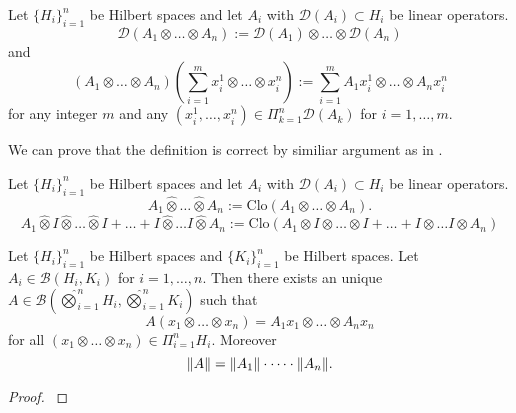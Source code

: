 \documentclass[main.tex]{subfiles}
\begin{document}
\begin{definition}
Let $\{H_i\}_{i=1}^n$ be Hilbert spaces and let $A_i$ with $\mathcal{D}(A_i)\subset H_i$ be linear operators.
\begin{equation}
\mathcal{D}(A_1 \otimes \dots \otimes A_n):=\mathcal{D}(A_1) \otimes \dots \otimes \mathcal{D}(A_n)
\end{equation}
and
\begin{equation}
(A_1 \otimes \dots \otimes A_n)(\sum_{i=1}^m x^1_i \otimes \dots \otimes x^n_i):= \sum_{i=1}^m A_1 x^1_i \otimes \dots \otimes A_n x^n_i
\end{equation}
for any integer $m$ and any $(x^1_i, \dots, x^n_i)\in\Pi_{k=1}^n \mathcal{D}(A_k)$ for $i=1, \dots, m$.
\end{definition}
We can prove that the definition is correct by similiar argument as in \cite[see][8.5 Analytic vectors and tensor products of
self-adjoint operators]{weidmann1980}.
\begin{definition}
Let $\{H_i\}_{i=1}^n$ be Hilbert spaces and let $A_i$ with $\mathcal{D}(A_i)\subset H_i$ be linear operators.
\begin{equation}
A_1 \hat{\otimes} \dots \hat{\otimes} A_n := \text{Clo}(A_1 \otimes \dots \otimes A_n).
\end{equation}
\begin{equation}
A_1 \hat{\otimes} I \hat{\otimes} \dots \hat{\otimes} I + \dots
+ I \hat{\otimes}\dots I \hat{\otimes} A_n:=\text{Clo}(A_1 \otimes I \otimes \dots \otimes I + \dots
+ I \otimes\dots I \otimes A_n)
\end{equation}
\end{definition}
\begin{theorem}
\label{bounded-operators-equaliser}
Let $\{H_i\}_{i=1}^n$ be Hilbert spaces and $\{K_i\}_{i=1}^n$ be Hilbert spaces. 
Let $A_i\in\mathcal{B}(H_i, K_i)$ for $i=1,\dots, n$. Then there exists 
an unique $A\in \mathcal{B}(\hat{\bigotimes}_{i=1}^n H_i, \hat{\bigotimes}_{i=1}^n K_i)$ such that
\begin{equation}
A(x_1 \otimes \dots \otimes x_n) = A_1 x_1 \otimes \dots \otimes A_n x_n
\end{equation} 
for all $(x_1 \otimes \dots \otimes x_n)\in \Pi_{i=1}^n H_i$.
Moreover 
\begin{equation}
\norm{A} = \norm{A_1}\cdot \dots \cdot \norm{A_n}.
\end{equation}
\end{theorem}
\begin{proof}
\cite[see][2.6 Constructions with Hilbert Spaces]{kadison-ringrose1983_I}
\end{proof}
\end{document}

